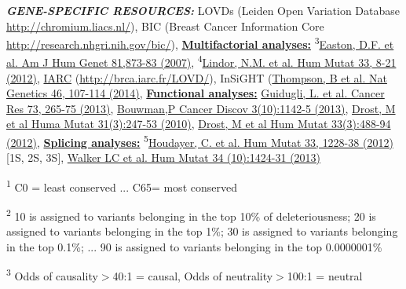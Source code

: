 \documentclass{report}\usepackage[]{graphicx}\usepackage[]{color}
\begin{document}
{\begin{minipage}[t]{0.9\columnwidth}
\smallskip

{\raggedright{}
\textsf{\textbf{\textsl{\scriptsize{GENE-SPECIFIC RESOURCES:}}}}
\textsf{\scriptsize{LOVDs (Leiden Open Variation Database \href{http://chromium.liacs.nl/}{http://chromium.liacs.nl/}), BIC (Breast Cancer Information Core \href{http://research.nhgri.nih.gov/bic/}{http://research.nhgri.nih.gov/bic/}),}}
\textsf{\textbf{\uline{\scriptsize{Multifactorial analyses:}}}}
\textsf{\scriptsize{
\textsuperscript{{\tiny{3}}}\href{http://www.ncbi.nlm.nih.gov/pubmed/17924331}{Easton, D.F. et al. Am J Hum Genet 81,873-83 (2007)},
\textsuperscript{{\tiny{4}}}\href{http://www.ncbi.nlm.nih.gov/pubmed/21990134}{Lindor, N.M. et al. Hum Mutat 33, 8-21 (2012)},
\href{http://www.ncbi.nlm.nih.gov/pubmed/21990165}{IARC} (\href{http://brca.iarc.fr/LOVD/}{http://brca.iarc.fr/LOVD/}), InSiGHT (\href{http://www.ncbi.nlm.nih.gov/pubmed/24362816}{Thompson, B et al. Nat Genetics 46, 107-114 (2014)},}}
\textsf{\textbf{\uline{\scriptsize{Functional analyses:}}}}
\textsf{\scriptsize{
\href{http://www.ncbi.nlm.nih.gov/pubmed/23108138}{Guidugli, L. et al. Cancer Res 73, 265-75 (2013)},
\href{http://www.ncbi.nlm.nih.gov/pubmed/23867111}{Bouwman,P Cancer Discov 3(10):1142-5 (2013)},
\href{http://www.ncbi.nlm.nih.gov/pubmed/20020535}{Drost, M et al Huma Mutat 31(3):247-53 (2010)},
\href{http://www.ncbi.nlm.nih.gov/pubmed/22102614}{Drost, M et al Hum Mutat 33(3):488-94 (2012)},}}
\textsf{\textbf{\uline{\scriptsize{Splicing analyses:}}}}\textsf{\scriptsize{}}
\textsf{\tiny{\textsuperscript{{\tiny{5}}}}}\textsf{\scriptsize{\href{http://www.ncbi.nlm.nih.gov/pubmed/22505045}{Houdayer, C. et al. Hum Mutat 33, 1228-38 (2012)}{[}1S, 2S, 3S{]}, \href{http://www.ncbi.nlm.nih.gov/pubmed/23893897}{Walker LC et al. Hum Mutat 34 (10):1424-31 (2013)}}}
}
{\scriptsize \par}

\medskip

\textsf{\tiny{\textsuperscript{{\tiny{1}}}}}
\textsf{\scriptsize{C0 = least conserved ... C65= most conserved }}
{\scriptsize \par}

\textsf{\tiny{\textsuperscript{{\tiny{2}}}}}
\textsf{\scriptsize{10 is assigned to variants belonging in the top 10\% of deleteriousness; 20 is assigned to variants belonging in the top 1\%; 30 is assigned to variants belonging in the top 0.1\%; ... 90 is assigned to variants belonging in the top 0.0000001\% }}
{\scriptsize \par}

\noindent 
\textsf{\tiny{\textsuperscript{{\tiny{3}}}}}
\textsf{\scriptsize{Odds of causality$>$40:1 = causal, Odds of neutrality$>$100:1 = neutral }}
{\scriptsize \par}


\end{minipage}}
\end{document}
